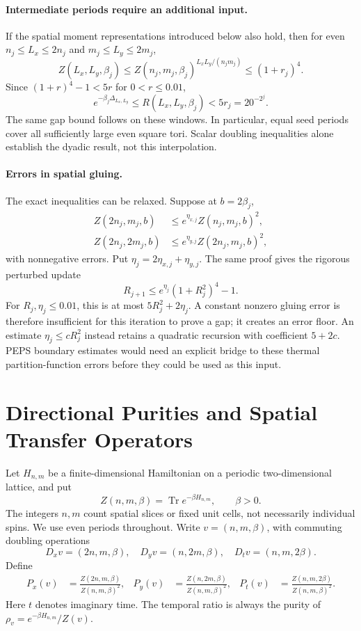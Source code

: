 \documentclass[11pt]{article}
\newcommand{\Tr}{\operatorname{Tr}}
\begin{document}
\paragraph{Intermediate periods require an additional input.}
If the spatial moment representations introduced below also hold,
then for even \(n_j\le L_x\le2n_j\) and \(m_j\le L_y\le2m_j\),
\[
	Z(L_x,L_y,\beta_j)
	\le Z(n_j,m_j,\beta_j)^{L_xL_y/(n_jm_j)}
	\le(1+r_j)^4.
\]
Since \((1+r)^4-1<5r\) for \(0<r\le0.01\),
\[
	e^{-\beta_j\Delta_{L_x,L_y}}
	\le R(L_x,L_y,\beta_j)<5r_j=20^{-2^j}.
\]
The same gap bound follows on these windows. In particular, equal seed
periods cover all sufficiently large even square tori. Scalar doubling
inequalities alone establish the dyadic result, not this interpolation.

\paragraph{Errors in spatial gluing.}
The exact inequalities can be relaxed. Suppose at \(b=2\beta_j\),
\begin{align*}
	Z(2n_j,m_j,b)  & \le e^{\eta_{x,j}}Z(n_j,m_j,b)^2,  \\
	Z(2n_j,2m_j,b) & \le e^{\eta_{y,j}}Z(2n_j,m_j,b)^2,
\end{align*}
with nonnegative errors. Put \(\eta_j=2\eta_{x,j}+\eta_{y,j}\).
The same proof gives the rigorous perturbed update
\begin{equation}
	\boxed{R_{j+1}\le e^{\eta_j}(1+R_j^2)^4-1.}
	\label{eq:ff-perturbed}
\end{equation}
For \(R_j,\eta_j\le0.01\), this is at most
\(5R_j^2+2\eta_j\). A constant nonzero gluing error is therefore
insufficient for this iteration to prove a gap; it creates an error
floor. An estimate \(\eta_j\le cR_j^2\) instead retains a quadratic
recursion with coefficient \(5+2c\). PEPS boundary estimates would
need an explicit bridge to these thermal partition-function errors
before they could be used as this input.

\section{Directional Purities and Spatial Transfer Operators}

Let \(H_{n,m}\) be a finite-dimensional Hamiltonian on a periodic
two-dimensional lattice, and put
\[
	Z(n,m,\beta)=\Tr e^{-\beta H_{n,m}},\qquad \beta>0.
\]
The integers \(n,m\) count spatial slices or fixed unit cells, not
necessarily individual spins. We use even periods throughout.
Write \(v=(n,m,\beta)\), with commuting doubling operations
\[
	D_xv=(2n,m,\beta),\quad D_yv=(n,2m,\beta),\quad
	D_tv=(n,m,2\beta).
\]
Define
\begin{align}
	P_x(v) & =\frac{Z(2n,m,\beta)}{Z(n,m,\beta)^2}, &
	P_y(v) & =\frac{Z(n,2m,\beta)}{Z(n,m,\beta)^2}, &
	P_t(v) & =\frac{Z(n,m,2\beta)}{Z(n,m,\beta)^2}.
	\label{eq:purities}
\end{align}
Here \(t\) denotes imaginary time. The temporal ratio is always the
purity of \(\rho_v=e^{-\beta H_{n,m}}/Z(v)\).
\end{document}
